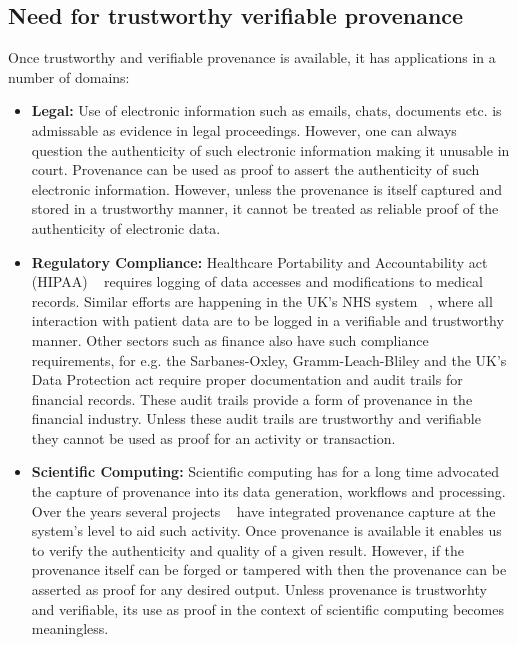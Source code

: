 \documentclass[withindex,glossary]{cam-thesis}
\begin{document}
\subsection{Need for trustworthy verifiable provenance}
Once trustworthy and verifiable provenance is available, it has applications in a number of domains:

\begin{itemize}

\item \textbf{Legal:}
Use of electronic information such as emails, chats, documents etc. is admissable as evidence in legal proceedings.
However, one can always question the authenticity of such electronic information making it unusable in court.
Provenance can be used as proof to assert the authenticity of such electronic information.
However, unless the provenance is itself captured and stored in a trustworthy manner, it cannot be treated as reliable proof of the authenticity of electronic data.

\item \textbf{Regulatory Compliance:}
Healthcare Portability and Accountability act (HIPAA) ~\cite{HIPAA} requires logging of data accesses and modifications to medical records.
Similar efforts are happening in the UK's NHS system ~\cite{deepmind}, where all interaction with patient data are to be logged in a verifiable and trustworthy manner.
Other sectors such as finance also have such compliance requirements, for e.g. the Sarbanes-Oxley, Gramm-Leach-Bliley and the UK's Data Protection act require proper documentation and audit trails for financial records.
These audit trails provide a form of provenance in the financial industry.
Unless these audit trails are trustworthy and verifiable they cannot be used as proof for an activity or transaction.

\item \textbf{Scientific Computing:}
Scientific computing has for a long time advocated the capture of provenance into its data generation, workflows and processing.
Over the years several projects ~\cite{PASS, SPADE, OPUS} have integrated provenance capture at the system's level to aid such activity.
Once provenance is available it enables us to verify the authenticity and quality of a given result.
However, if the provenance itself can be forged or tampered with then the provenance can be asserted as proof for any desired output. 
Unless provenance is trustworhty and verifiable, its use as proof in the context of scientific computing becomes meaningless.


\end{itemize}
\end{document}

